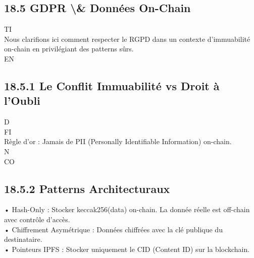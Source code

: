 \documentclass[12pt,landscape,a4paper]{article}
\begin{document}
\subsection{18.5 GDPR \textbackslash{}& Données On-Chain}
\vspace{0.5em}
\vspace{0.5em}
\vspace{0.5em}
\vspace{0.5em}
TI\\
Nous clarifions ici comment respecter le RGPD dans un contexte d’immuabilité on-chain en privilégiant des patterns sûrs.\\
\vspace{0.5em}
\vspace{0.5em}
\vspace{0.5em}
\vspace{0.5em}
EN\\
\subsection{18.5.1 Le Conflit Immuabilité vs Droit à l’Oubli}
\vspace{0.5em}
\vspace{0.5em}
\vspace{0.5em}
\vspace{0.5em}
D\\
FI\\
Règle d’or : Jamais de PII (Personally Identifiable Information) on-chain.\\
\vspace{0.5em}
\vspace{0.5em}
N\\
CO\\
\subsection{18.5.2 Patterns Architecturaux}
• Hash-Only : Stocker keccak256(data) on-chain. La donnée réelle est off-chain avec contrôle d’accès.\\
\vspace{0.5em}
• Chiffrement Asymétrique : Données chiffrées avec la clé publique du destinataire.\\
\vspace{0.5em}
• Pointeurs IPFS : Stocker uniquement le CID (Content ID) sur la blockchain.\\
\vspace{0.5em}
\vspace{0.5em}
\end{document}
